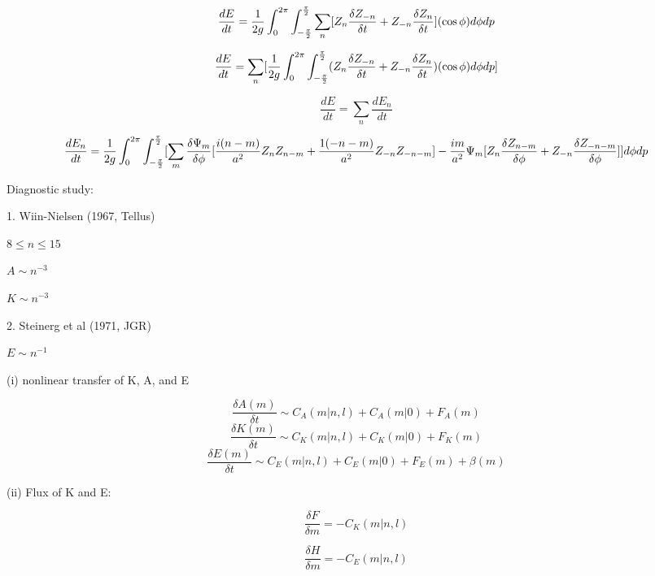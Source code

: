 \documentclass{article}
\begin{document}
\begin{equation}
\frac{dE}{dt} = \frac{1}{2g} \int_{0}^{2\pi} \int_{-\frac{\pi}{2}}^{\frac{\pi}{2}} \sum_n [ Z_n \frac{\delta Z_{-n}}{\delta t} + Z_{-n} \frac{\delta Z_n}{\delta t} ] (\cos{\phi}) d\phi dp
\end{equation}

\begin{equation}
\frac{dE}{dt} = \sum_n [ \frac{1}{2g} \int_{0}^{2\pi} \int_{-\frac{\pi}{2}}^{\frac{\pi}{2}} (Z_n \frac{\delta Z_{-n}}{\delta t} + Z_{-n} \frac{\delta Z_n}{\delta t} ) (\cos{\phi}) d\phi dp ]
\end{equation}

\begin{equation}
\frac{dE}{dt} = \sum_n \frac{dE_n}{dt}
\end{equation}

\begin{equation}
\frac{dE_n}{dt} = \frac{1}{2g} \int_{0}^{2\pi} \int_{-\frac{\pi}{2}}^{\frac{\pi}{2}} [ \sum_m \frac{\delta \Psi_m}{\delta \phi} [ \frac{i(n-m)}{a^2} Z_n Z_{n-m} + \frac{1(-n-m)}{a^2} Z_{-n} Z_{-n-m} ] - \frac{im}{a^2} \Psi_m [ Z_n \frac{\delta Z_{n-m}}{\delta \phi} + Z_{-n} \frac{\delta Z_{-n-m}}{\delta \phi} ] ] d\phi dp
\end{equation}

Diagnostic study:

1. Wiin-Nielsen (1967, Tellus)

$8 \leq n \leq 15$

$A \sim n^{-3}$

$K \sim n^{-3}$

2. Steinerg et al (1971, JGR)

$E \sim n^{-1}$

(i) nonlinear transfer of K, A, and E

\begin{equation}
\frac{\delta A(m)}{\delta t} \sim C_{A}(m|n,l) + C_{A}(m|0) + F_{A}(m)
\end{equation}
\begin{equation}
\frac{\delta K(m)}{\delta t} \sim C_{K}(m|n,l) + C_{K}(m|0) + F_{K}(m)
\end{equation}
\begin{equation}
\frac{\delta E(m)}{\delta t} \sim C_{E}(m|n,l) + C_{E}(m|0) + F_{E}(m) + \beta (m)
\end{equation}

(ii) Flux of K and E:

\begin{equation}
\frac{\delta F}{\delta m} = - C_{K}(m|n,l)
\end{equation}

\begin{equation}
\frac{\delta H}{\delta m} = - C_{E}(m|n,l)
\end{equation}
\end{document}
